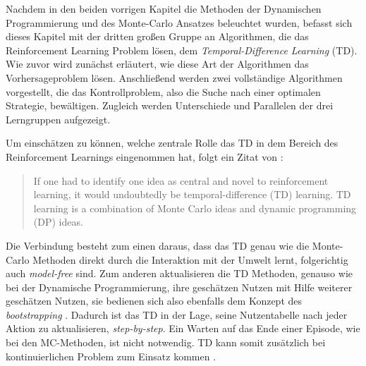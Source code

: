
Nachdem in den beiden vorrigen Kapitel die Methoden der Dynamischen Programmierung und des Monte-Carlo Ansatzes beleuchtet wurden, befasst sich dieses Kapitel mit der dritten großen Gruppe an Algorithmen, die das Reinforcement Learning Problem lösen, dem \textit{Temporal-Difference Learning} (TD).
Wie zuvor wird zunächst erläutert, wie diese Art der Algorithmen das Vorhersageproblem lösen. Anschließend werden zwei vollständige Algorithmen vorgestellt, die das Kontrollproblem, also die Suche nach einer optimalen Strategie, bewältigen. Zugleich werden Unterschiede und Parallelen der drei Lerngruppen aufgezeigt.
\par 
Um einschätzen zu können, welche zentrale Rolle das TD in dem Bereich des Reinforcement Learnings eingenommen hat, folgt ein Zitat von \cite{Sutton1998}:
\begin{quote}
    If one had to identify one idea as central and novel to reinforcement learning, it would undoubtedly be temporal-difference (TD) learning. TD learning is a combination of Monte Carlo ideas and dynamic programming (DP) ideas. \cite[S.~119]{Sutton1998}
\end{quote}

Die Verbindung besteht zum einen daraus, dass das TD genau wie die Monte-Carlo Methoden direkt durch die Interaktion mit der Umwelt lernt, folgerichtig auch \textit{model-free} sind. Zum anderen aktualisieren die TD Methoden, genauso wie bei der Dynamische Programmierung, ihre geschätzen Nutzen mit Hilfe weiterer geschätzen Nutzen, sie bedienen sich also ebenfalls dem Konzept des \textit{bootstrapping} \cite[S.~119]{Sutton1998}. Dadurch ist das TD in der Lage, seine Nutzentabelle nach jeder Aktion zu aktualisieren, \textit{step-by-step}. Ein Warten auf das Ende einer Episode, wie bei den MC-Methoden, ist nicht notwendig. TD kann somit zusätzlich bei kontinuierlichen Problem zum Einsatz kommen \cite[S.~124]{Sutton1998}.
\par 

